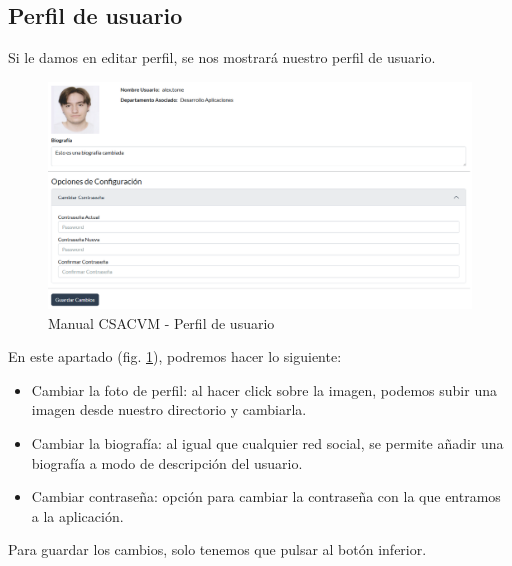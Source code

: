 \subsection{Perfil de usuario}
Si le damos en editar perfil, se nos mostrará nuestro perfil de usuario.
\begin{figure}
    \centering
    \includegraphics[width=\linewidth]{img/ManualUsuario/Manual04.png}
    \caption{Manual CSACVM - Perfil de usuario}
    \label{manualPerfil}
\end{figure}

En este apartado (fig. \ref{manualPerfil}), podremos hacer lo siguiente:
\begin{itemize}
    \item Cambiar la foto de perfil: al hacer click sobre la imagen, podemos subir una imagen desde nuestro directorio y cambiarla.
    \item Cambiar la biografía: al igual que cualquier red social, se permite añadir una biografía a modo de descripción del usuario.
    \item Cambiar contraseña: opción para cambiar la contraseña con la que entramos a la aplicación.
\end{itemize}

Para guardar los cambios, solo tenemos que pulsar al botón inferior.

